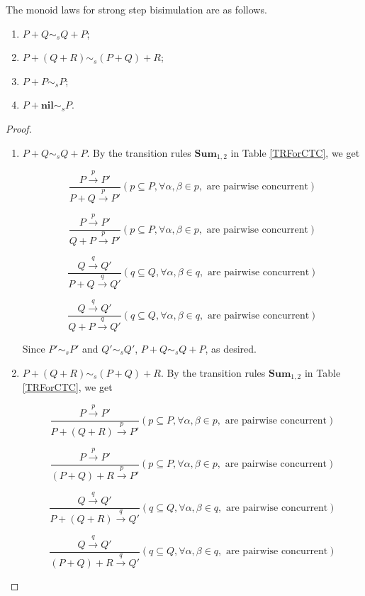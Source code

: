 \begin{proposition} The monoid laws for strong step bisimulation are as follows.
\begin{enumerate}
  \item $P+Q\sim_s Q+P$;
  \item $P+(Q+R)\sim_s (P+Q)+R$;
  \item $P+P\sim_s P$;
  \item $P+\textbf{nil}\sim_s P$.
\end{enumerate}
\end{proposition}

\begin{proof}
\begin{enumerate}
  \item $P+Q\sim_s Q+P$. By the transition rules $\textbf{Sum}_{1,2}$ in Table \ref{TRForCTC}, we get

      $$\frac{P\xrightarrow{p}P'}{P+ Q\xrightarrow{p}P'} (p\subseteq P,\forall\alpha,\beta \in p,\textrm{ are pairwise concurrent})$$

      $$\frac{P\xrightarrow{p}P'}{Q+ P\xrightarrow{p}P'}(p\subseteq P,\forall\alpha,\beta \in p,\textrm{ are pairwise concurrent})$$

      $$\frac{Q\xrightarrow{q}Q'}{P+ Q\xrightarrow{q}Q'}(q\subseteq Q,\forall\alpha,\beta \in q,\textrm{ are pairwise concurrent})$$

      $$\frac{Q\xrightarrow{q}Q'}{Q+ P\xrightarrow{q}Q'}(q\subseteq Q,\forall\alpha,\beta \in q,\textrm{ are pairwise concurrent})$$

      Since $P'\sim_s P'$ and $Q'\sim_s Q'$, $P+ Q\sim_s Q+ P$, as desired.
  \item $P+(Q+R)\sim_s (P+Q)+R$. By the transition rules $\textbf{Sum}_{1,2}$ in Table \ref{TRForCTC}, we get

      $$\frac{P\xrightarrow{p}P'}{P+(Q+R)\xrightarrow{p}P'}(p\subseteq P,\forall\alpha,\beta \in p,\textrm{ are pairwise concurrent})$$

      $$\frac{P\xrightarrow{p}P'}{(P+Q)+R\xrightarrow{p}P'}(p\subseteq P,\forall\alpha,\beta \in p,\textrm{ are pairwise concurrent})$$

      $$\frac{Q\xrightarrow{q}Q'}{P+(Q+R)\xrightarrow{q}Q'}(q\subseteq Q,\forall\alpha,\beta \in q,\textrm{ are pairwise concurrent})$$

      $$\frac{Q\xrightarrow{q}Q'}{(P+Q)+R\xrightarrow{q}Q'}(q\subseteq Q,\forall\alpha,\beta \in q,\textrm{ are pairwise concurrent})$$


\end{enumerate}
\end{proof}
